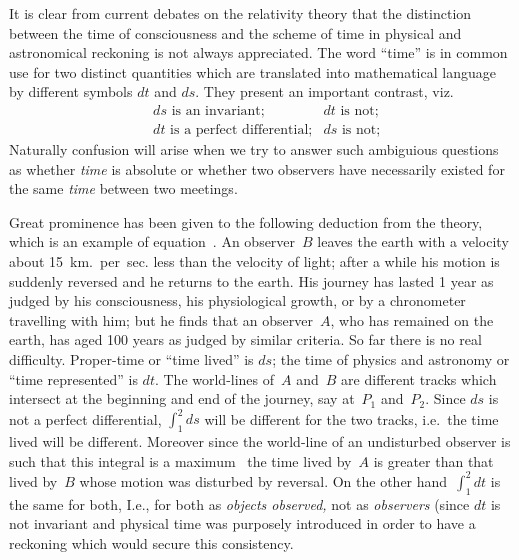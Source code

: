 \documentclass[12pt]{book}
\begin{document}
It is clear from current debates on the relativity theory that the distinction between the
time of consciousness and the scheme of time in physical and astronomical reckoning is not
always appreciated.
The word ``time'' is in common use for two distinct quantities which are translated into
mathematical language by different symbols $dt$ and $ds$.
They present an important contrast, viz.
\begin{align*}
&\text{$ds$ is an invariant;} & \text{$dt$ is not;}\\
&\text{$dt$ is a perfect differential;} & \text{$ds$ is not;}
\end{align*}
Naturally confusion will arise when we try to answer such ambiguious questions as whether
\emph{time} is absolute or whether two observers have necessarily existed for the same \emph{time}
between two meetings.

Great prominence has been given to the following deduction from the theory, which is an example
of equation~.
An observer~$B$ leaves the earth with a velocity about 15~km.\ per~sec. less than the velocity of light;
after a while his motion is suddenly reversed and he returns to the earth.
His journey has lasted 1 year as judged by his consciousness, his physiological growth, or by a chronometer
travelling with him; but he finds that an observer~$A$, who has remained on the earth, has aged 100 years
as judged by similar criteria.
So far there is no real difficulty.
Proper-time or ``time lived'' is $ds$; the time of physics and astronomy or ``time represented'' is $dt$.
The world-lines of~$A$ and~$B$ are different tracks which intersect at the beginning and end of the journey,
say at~$P_1$ and~$P_2$.
Since $ds$ is not a perfect differential, $\int_1^2 ds$ will be different for the two tracks, i.e.\ the time
lived will be different.
Moreover since the world-line of an undisturbed observer is such that this integral is a maximum~
the time lived by~$A$ is greater than that lived by~$B$ whose motion was disturbed by reversal.
On the other hand~$\int_1^2 dt$ is the same for
both\footnotemark,\footnotetext
    {I.e., for both as \emph{objects observed,} not as \emph{observers} (since $dt$ is not invariant}
and physical time was purposely introduced in order to have a reckoning which would secure this
consistency.
\end{document}
